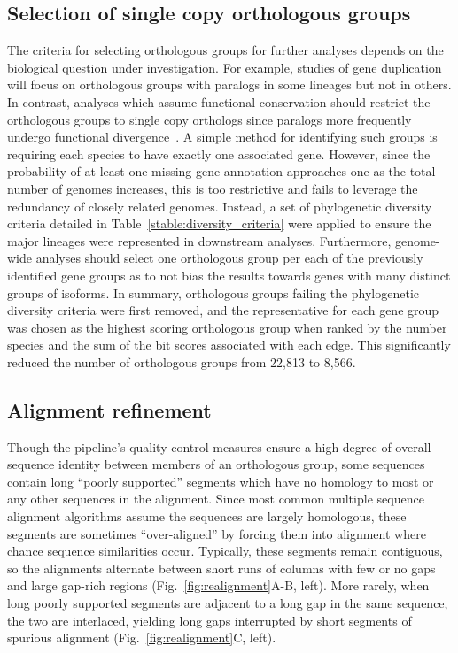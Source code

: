 \subsection{Selection of single copy orthologous groups}
The criteria for selecting orthologous groups for further analyses depends on the biological question under investigation. For example, studies of gene duplication will focus on orthologous groups with paralogs in some lineages but not in others. In contrast, analyses which assume functional conservation should restrict the orthologous groups to single copy orthologs since paralogs more frequently undergo functional divergence~\cite{Altenhoff2012, Pegueroles2013, Soria2014}. A simple method for identifying such groups is requiring each species to have exactly one associated gene. However, since the probability of at least one missing gene annotation approaches one as the total number of genomes increases, this is too restrictive and fails to leverage the redundancy of closely related genomes. Instead, a set of phylogenetic diversity criteria detailed in Table~\ref{stable:diversity_criteria} were applied to ensure the major lineages were represented in downstream analyses. Furthermore, genome-wide analyses should select one orthologous group per each of the previously identified gene groups as to not bias the results towards genes with many distinct groups of isoforms. In summary, orthologous groups failing the phylogenetic diversity criteria were first removed, and the representative for each gene group was chosen as the highest scoring orthologous group when ranked by the number species and the sum of the bit scores associated with each edge. This significantly reduced the number of orthologous groups from 22,813 to 8,566.

\subsection{Alignment refinement}
Though the pipeline’s quality control measures ensure a high degree of overall sequence identity between members of an orthologous group, some sequences contain long ``poorly supported'' segments which have no homology to most or any other sequences in the alignment. Since most common multiple sequence alignment algorithms assume the sequences are largely homologous, these segments are sometimes ``over-aligned'' by forcing them into alignment where chance sequence similarities occur. Typically, these segments remain contiguous, so the alignments alternate between short runs of columns with few or no gaps and large gap-rich regions (Fig.~\ref{fig:realignment}A-B, left). More rarely, when long poorly supported segments are adjacent to a long gap in the same sequence, the two are interlaced, yielding long gaps interrupted by short segments of spurious alignment (Fig.~\ref{fig:realignment}C, left).

